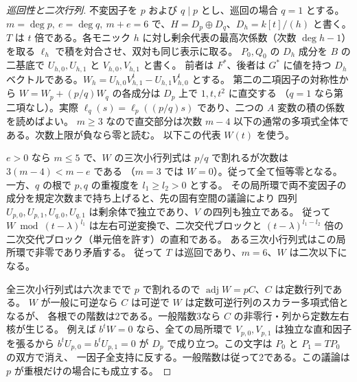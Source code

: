 \begin{proof}[巡回性と二次行列]
不変因子を $p$ および $q\mid p$ とし、巡回の場合 $q=1$ とする。
$m=\deg p,\ e=\deg q,\ m+e=6$ で、$H=D_p\oplus D_q$、$D_h=k[t]/(h)$ と書く。
$T$ は $t$ 倍である。各モニック $h$ に対し剰余代表の最高次係数（次数 $\deg h-1$）を取る
$\ell_h$ で積を対合させ、双対も同じ表示に取る。
$P_0,Q_0$ の $D_h$ 成分を $B$ の二基底で $U_{h,0},U_{h,1}$ と $V_{h,0},V_{h,1}$ と書く。
前者は $F^*$、後者は $G^*$ に値を持つ $D_h$ ベクトルである。$W_h=U_{h,0}V_{h,1}^t-U_{h,1}V_{h,0}^t$ とする。
第二の二項因子の対称性から $W=W_p+(p/q)W_q$ の各成分は $D_p$ 上で $1,t,t^2$ に直交する
（$q=1$ なら第二項なし）。実際 $\ell_q(s)=\ell_p((p/q)s)$ であり、二つの $A$ 変数の積の係数を読めばよい。
$m\ge3$ なので直交部分は次数 $m-4$ 以下の通常の多項式全体である。次数上限が負なら零と読む。
以下この代表 $W(t)$ を使う。

$e>0$ なら $m\le5$ で、$W$ の三次小行列式は $p/q$ で割れるが次数は $3(m-4)<m-e$ である
（$m=3$ では $W=0$）。従って全て恒等零となる。
一方、$q$ の根で $p,q$ の重複度を $l_1\ge l_2>0$ とする。
その局所環で両不変因子の成分を規定次数まで持ち上げると、先の固有空間の議論により
四列 $U_{p,0},U_{p,1},U_{q,0},U_{q,1}$ は剰余体で独立であり、$V$ の四列も独立である。
従って $W\bmod (t-\lambda)^{l_1}$ は左右可逆変換で、二次交代ブロックと
$(t-\lambda)^{l_1-l_2}$ 倍の二次交代ブロック（単元倍を許す）の直和である。
ある三次小行列式はこの局所環で非零であり矛盾する。
従って $T$ は巡回であり、$m=6$、$W$ は二次以下になる。

全三次小行列式は六次までで $p$ で割れるので $\operatorname{adj} W=p C$、$C$ は定数行列である。
$W$ が一般に可逆なら $C$ は可逆で $W$ は定数可逆行列のスカラー多項式倍となるが、
各根での階数は2である。一般階数3なら $C$ の非零行・列から定数左右核が生じる。
例えば $b^tW=0$ なら、全ての局所環で $V_{p,0},V_{p,1}$ は独立な直和因子を張るから
$b^t U_{p,0}=b^t U_{p,1}=0$ が $D_p$ で成り立つ。この文字は $P_0$ と $P_1=TP_0$ の双方で消え、
一因子全支持に反する。一般階数は従って2である。この議論は $p$ が重根だけの場合にも成立する。
\end{proof}

